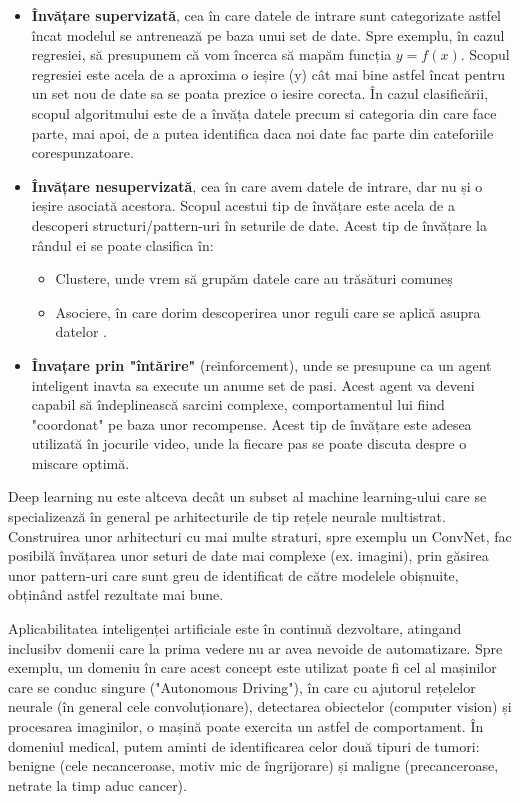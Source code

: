 \documentclass[a4paper,12pt]{report}
\begin{document}
   	 \begin{itemize}
   	 	\item \textbf{Învățare supervizată}, cea în care datele de intrare sunt categorizate astfel încat modelul se antrenează pe baza unui set de date. Spre exemplu, în cazul regresiei, să presupunem că vom încerca să mapăm funcția $y = f(x) $. Scopul regresiei este acela de a aproxima o ieșire (y) cât mai bine astfel încat pentru un set nou de date sa se poata prezice o iesire corecta. În cazul clasificării, scopul algoritmului este de a învăța datele precum si categoria din care face parte, mai apoi, de a putea identifica daca noi date fac parte din cateforiile corespunzatoare.
   	 	
   	 	\item \textbf{Învățare nesupervizată}, cea în care avem datele de intrare, dar nu și o ieșire asociată acestora. Scopul acestui tip de învățare este acela de a descoperi structuri/pattern-uri în seturile de date. Acest tip de învățare la rândul ei se poate clasifica în: 
   	 	\begin{itemize}
   	 		\item Clustere, unde vrem să grupăm datele care au trăsături comuneș
   	 		\item Asociere, în care dorim descoperirea unor reguli care se aplică asupra datelor .
   	 	\end{itemize}
    	
    	\item \textbf{Învațare prin "întărire"} (reinforcement), unde se presupune ca un agent inteligent inavta sa execute un anume set de pasi. Acest agent va deveni capabil să îndeplinească sarcini complexe, comportamentul lui fiind "coordonat" pe baza unor recompense. Acest tip de învățare este adesea utilizată în jocurile video, unde la fiecare pas se poate discuta despre o miscare optimă.
   	 \end{itemize}
    
    Deep learning nu este altceva decât un subset al machine learning-ului care se specializează în general pe arhitecturile de tip rețele neurale multistrat. Construirea unor arhitecturi cu mai multe straturi, spre exemplu un ConvNet, fac posibilă învățarea unor seturi de date mai complexe (ex. imagini), prin găsirea unor pattern-uri care sunt greu de identificat de către modelele obișnuite, obținând astfel rezultate mai bune.
    
   	Aplicabilitatea inteligenței artificiale este în continuă dezvoltare, atingand inclusibv domenii care la prima vedere nu ar avea nevoide de automatizare. Spre exemplu, un domeniu în care acest concept este utilizat poate fi cel al mașinilor care se conduc singure ("Autonomous Driving"), în care cu ajutorul rețelelor neurale (în general cele convoluționare), detectarea obiectelor (computer vision) și procesarea imaginilor, o mașină poate exercita un astfel de comportament. În domeniul medical, putem aminti de identificarea celor două tipuri de tumori: benigne (cele necanceroase, motiv mic de îngrijorare) și maligne (precanceroase, netrate la timp aduc cancer). 
   	
\end{document}
